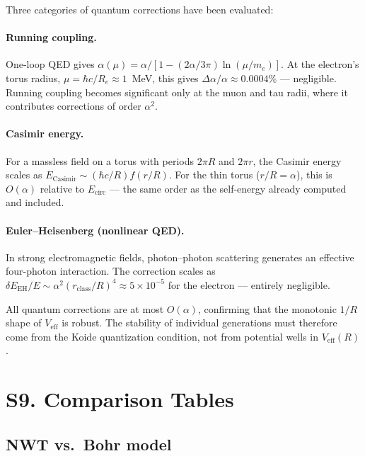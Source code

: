 \documentclass[11pt,a4paper]{article}
\begin{document}
Three categories of quantum corrections have been evaluated:

\paragraph{Running coupling.}
One-loop QED gives $\alpha(\mu) = \alpha / [1 - (2\alpha/3\pi)\ln(\mu/m_e)]$. At the electron's torus radius, $\mu = \hbar c/R_e \approx 1$~MeV, this gives $\Delta\alpha/\alpha \approx 0.0004\%$ --- negligible. Running coupling becomes significant only at the muon and tau radii, where it contributes corrections of order $\alpha^2$.

\paragraph{Casimir energy.}
For a massless field on a torus with periods $2\pi R$ and $2\pi r$, the Casimir energy scales as $E_{\text{Casimir}} \sim (\hbar c/R) f(r/R)$. For the thin torus ($r/R = \alpha$), this is $O(\alpha)$ relative to $E_{\text{circ}}$ --- the same order as the self-energy already computed and included.

\paragraph{Euler--Heisenberg (nonlinear QED).}
In strong electromagnetic fields, photon--photon scattering generates an effective four-photon interaction. The correction scales as $\delta E_{\text{EH}}/E \sim \alpha^2(r_{\text{class}}/R)^4 \approx 5 \times 10^{-5}$ for the electron --- entirely negligible.

All quantum corrections are at most $O(\alpha)$, confirming that the monotonic $1/R$ shape of $V_{\text{eff}}$ is robust. The stability of individual generations must therefore come from the Koide quantization condition, not from potential wells in $V_{\text{eff}}(R)$.

\section{S9. Comparison Tables}
\label{sec:S9}

\subsection{NWT vs.\ Bohr model}
\end{document}
